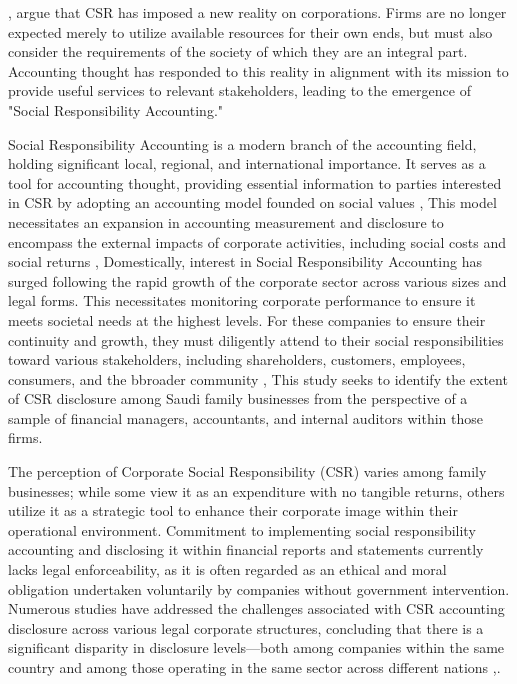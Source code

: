 \documentclass[10pt]{NSP1}
\begin{document}
\cite{ref2}, argue that CSR has imposed a new reality on corporations. Firms are no longer expected merely to utilize available resources for their own ends, but must also consider the requirements of the society of which they are an integral part. Accounting thought has responded to this reality in alignment with its mission to provide useful services to relevant stakeholders, leading to the emergence of "Social Responsibility Accounting."

Social Responsibility Accounting is a modern branch of the accounting field, holding significant local, regional, and international importance. It serves as a tool for accounting thought, providing essential information to parties interested in CSR by adopting an accounting model founded on social values \cite{ref3}, This model necessitates an expansion in accounting measurement and disclosure to encompass the external impacts of corporate activities, including social costs and social returns \cite{ref4}, Domestically, interest in Social Responsibility Accounting has surged following the rapid growth of the corporate sector across various sizes and legal forms. This necessitates monitoring corporate performance to ensure it meets societal needs at the highest levels. For these companies to ensure their continuity and growth, they must diligently attend to their social responsibilities toward various stakeholders, including shareholders, customers, employees, consumers, and the bbroader community \cite{ref5}, This study seeks to identify the extent of CSR disclosure among Saudi family businesses from the perspective of a sample of financial managers, accountants, and internal auditors within those firms.

\par\vspace{6.0pt}\vspace{12.0pt}

\par\vspace{6.0pt}\vspace{6.0pt}

The perception of Corporate Social Responsibility (CSR) varies among family businesses; while some view it as an expenditure with no tangible returns, others utilize it as a strategic tool to enhance their corporate image within their operational environment. Commitment to implementing social responsibility accounting and disclosing it within financial reports and statements currently lacks legal enforceability, as it is often regarded as an ethical and moral obligation undertaken voluntarily by companies without government intervention. Numerous studies have addressed the challenges associated with CSR accounting disclosure across various legal corporate structures, concluding that there is a significant disparity in disclosure levels—both among companies within the same country and among those operating in the same sector across different nations \cite{ref37},.
\end{document}
